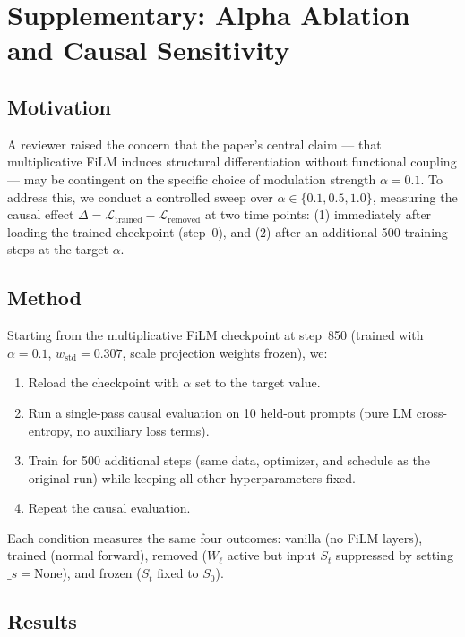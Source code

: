 \section{Supplementary: Alpha Ablation and Causal Sensitivity}

\label{app:alpha_ablation}

\subsection{Motivation}

A reviewer raised the concern that the paper's central claim --- that multiplicative
FiLM induces structural differentiation without functional coupling --- may be
contingent on the specific choice of modulation strength $\alpha = 0.1$. To address
this, we conduct a controlled sweep over $\alpha \in \{0.1, 0.5, 1.0\}$, measuring
the causal effect $\Delta = \mathcal{L}_{\text{trained}} - \mathcal{L}_{\text{removed}}$
at two time points: (1) immediately after loading the trained checkpoint (step~0), and
(2) after an additional 500 training steps at the target $\alpha$.

\subsection{Method}

Starting from the multiplicative FiLM checkpoint at step~850 (trained with $\alpha=0.1$,
$w_{\mathrm{std}} = 0.307$, scale projection weights frozen), we:

\begin{enumerate}
  \item Reload the checkpoint with $\alpha$ set to the target value.
  \item Run a single-pass causal evaluation on 10 held-out prompts (pure LM
    cross-entropy, no auxiliary loss terms).
  \item Train for 500 additional steps (same data, optimizer, and schedule as the
    original run) while keeping all other hyperparameters fixed.
  \item Repeat the causal evaluation.
\end{enumerate}

Each condition measures the same four outcomes: vanilla (no FiLM layers), trained
(normal forward), removed ($W_\ell$ active but input $S_t$ suppressed by setting
$\_s = \text{None}$), and frozen ($S_t$ fixed to $S_0$).

\subsection{Results}

